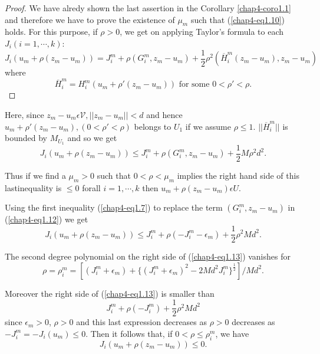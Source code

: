 \begin{proof}
We have alredy shown the last assertion in the Corollary \ref{chap4-coro1.1} and therefore we have to prove the existence of $\mu_{m}$ such that (\ref{chap4-eq1.10}) holds. For this purpose, if $\rho > 0$, we get on applying Taylor's formula to each $J_{i} (i = 1, \cdots, k)$:
\begin{equation*}
J_{i} (u_{m} + \rho(z_{m}-u_{m})) = J_{i}^{m} + \rho(G_{i}^{m}, z_{m}-u_{m}) + \frac{1}{2} \rho^{2} (\overline{H}_{i}^{m}(z_{m}-u_{m}), z_{m}-u_{m})\tag{1.11}\label{chap4-eq1.11}
\end{equation*}
where
$$
\overline{H}_{i}^{m} = H_{i}^{m} (u_{m} + \rho'(z_{m}-u_{m})) \text{ for some } 0 < \rho' < \rho.
$$
\end{proof}

Here, since $z_{m}-u_{m} \epsilon \mathscr{V}, ||z_{m}-u_{m}|| < d$ and hence $u_{m} + \rho'(z_{m}-u_{m}), (0 < \rho' < \rho)$ belongs to $U_{1}$ if we assume $\rho \leq 1$. $||\overline{H}_{i}^{m}||$ is bounded by $M_{U_{1}}$ and so we get
\begin{equation*}
J_{i} (u_{m} + \rho(z_{m}-u_{m})) \leq J_{i}^{m} + \rho(G_{i}^{m}, z_{m}-u_{m}) + \frac{1}{2} M \rho^{2} d^{2}.\tag{1.12}\label{chap4-eq1.12}
\end{equation*}

Thus if we find a $\mu_{m} > 0$ such that $0 < \rho < \mu_{m}$ implies the right hand side of this last\pageoriginale inequality is $\leq 0$ forall $i=1, \cdots, k$ then $u_{m} + \rho(z_{m}-u_{m}) \epsilon U$.

Using the first inequality (\ref{chap4-eq1.7}) to replace the term $(G_{i}^{m}, z_{m}-u_{m})$ in (\ref{chap4-eq1.12}) we get
\begin{equation*}
J_{i}(u_{m} + \rho(z_{m}-u_{m})) \leq J_{i}^{m} + \rho(-J_{i}^{m} - \epsilon_{m}) + \frac{1}{2} \rho^{2} Md^{2}.\tag{1.13}\label{chap4-eq1.13}
\end{equation*}

The second degree polynomial on the right side of (\ref{chap4-eq1.13}) vanishes for
\begin{equation*}
\rho = \rho_{i}^{m} = [(J_{i}^{m} + \epsilon_{m}) + \{(J_{i}^{m} + \epsilon_{m})^{2} - 2Md^{2} J_{i}^{m}\}^{\frac{1}{2}}]/ Md^{2}.\tag{1.14}\label{chap4-eq1.14}
\end{equation*}

Moreover the right side of (\ref{chap4-eq1.13}) is smaller than
$$
J_{i}^{m} + \rho(-J_{i}^{m}) + \frac{1}{2} \rho^{2} Md^{2}
$$
since $\epsilon_{m} > 0$, $\rho > 0$ and this last expression decreases as $\rho > 0$ decreases as $-J_{i}^{m} = -J_{i}(u_{m}) \leq 0$. Then it follows that, if $0 < \rho \leq \rho_{i}^{m}$, we have
$$
J_{i} (u_{m} + \rho(z_{m}-u_{m})) \leq 0.
$$

